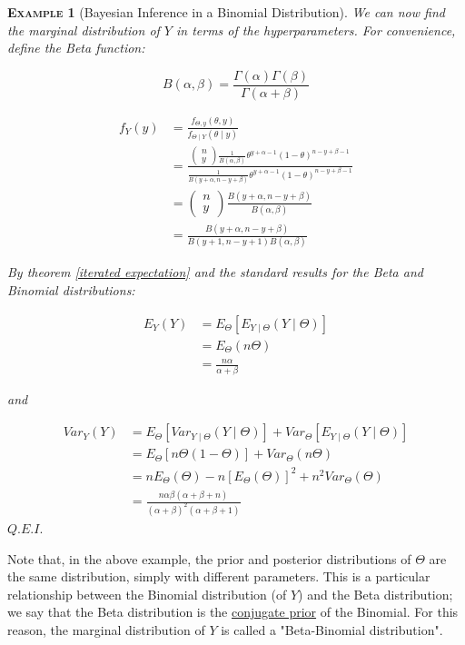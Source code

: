 \documentclass[12pt,a4paper]{article}
\newtheorem{example}{\textsc{Example}}[section]
\begin{document}
\begin{example}[Bayesian Inference in a Binomial Distribution]
We can now find the marginal distribution of $Y$ in terms of the hyperparameters. For convenience, define the Beta function:

$$B(\alpha,\beta) = \frac{\Gamma(\alpha)\Gamma(\beta)}{\Gamma(\alpha + \beta)}$$

\begin{align*}
f_Y(y) &= \frac{f_{\Theta,y}(\theta,y)}{f_{\Theta\mid Y}(\theta \mid y)}\\
&= \frac{\left(\!\!\begin{array}{c} n\\y \end{array}\!\!\right) \frac{1}{B(\alpha,\beta)} \theta^{y+\alpha-1} (1-\theta)^{n-y+\beta-1}}{\frac{1}{B(y+\alpha,n-y+\beta)} \theta^{y+\alpha-1} (1-\theta)^{n-y+\beta -1}}\\
&= \left(\!\!\begin{array}{c} n\\y \end{array}\!\!\right) \frac{B(y+\alpha,n-y+\beta)}{B(\alpha,\beta)}\\
&= \frac{B(y+\alpha,n-y+\beta)}{B(y+1,n-y+1)B(\alpha,\beta)}
\end{align*}

By theorem \ref{iterated expectation} and the standard results for the Beta and Binomial distributions:

\begin{align*}
E_Y(Y) &= E_\Theta[E_{Y\mid \Theta}(Y\mid\Theta)]\\
&= E_\Theta(n\Theta)\\
&= \frac{n\alpha}{\alpha+\beta}
\end{align*}
\begin{center} and \end{center}
\begin{align*}
Var_Y(Y) &= E_\Theta[Var_{Y\mid\Theta}(Y\mid\Theta)] + Var_\Theta[E_{Y\mid\Theta}(Y\mid\Theta)]\\
&= E_\Theta[n\Theta(1-\Theta)] + Var_\Theta(n\Theta)\\
&= nE_\Theta(\Theta) - n[E_\Theta(\Theta)]^2 + n^2 Var_\Theta(\Theta)\\
&=  \frac{n\alpha\beta(\alpha+\beta+n)}{(\alpha+\beta)^2(\alpha+\beta+1)}
\end{align*}\hfill$Q.E.I.$

\end{example}

Note that, in the above example, the prior and posterior distributions of $\Theta$ are the same distribution, simply with different parameters. This is a particular relationship between the Binomial distribution (of $Y$) and the Beta distribution; we say that the Beta distribution is the \underline{conjugate prior} of the Binomial. For this reason, the marginal distribution of $Y$ is called a "Beta-Binomial distribution".
\end{document}
